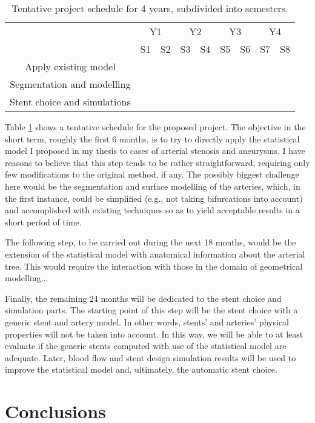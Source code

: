 \documentclass[a4paper]{article}
\begin{document}
\begin{table}[h]
\centering
\caption{Tentative project schedule for 4 years, subdivided into semesters.}
\begin{tabular}{c|c|c|c|c|c|c|c|c|}
\cline{2-9}
 & \multicolumn{2}{|c|}{Y1} & \multicolumn{2}{|c|}{Y2} & \multicolumn{2}{|c|}{Y3} & \multicolumn{2}{|c|}{Y4} \\ \cline{2-9}
 & S1 & S2 & S3 & S4 & S5 & S6 & S7 & S8  \\ \hline
\multicolumn{1}{|c|}{Apply existing model} & \cellcolor{green} & & & & & & & \\ \hline
\multicolumn{1}{|c|}{Segmentation and modelling} & & \cellcolor{green} & \cellcolor{green} & \cellcolor{green} & & & & \\ \hline
\multicolumn{1}{|c|}{Stent choice and simulations} & & & & & \cellcolor{green} & \cellcolor{green} & \cellcolor{green} & \cellcolor{green} \\ \hline
\end{tabular}
\label{tab:schedule}
\end{table}

Table \ref{tab:schedule} shows a tentative schedule for the proposed project. The objective in the short term, roughly the first 6 months, is to try to directly apply the statistical model I proposed in my thesis to cases of arterial stenosis and aneurysms. I have reasons to believe that this step tends to be rather straightforward, requiring only few modifications to the original method, if any. The possibly biggest challenge here would be the segmentation and surface modelling of the arteries, which, in the first instance, could be simplified (e.g., not taking bifurcations into account) and accomplished with existing techniques so as to yield acceptable results in a short period of time. 

The following step, to be carried out during the next 18 months, would be the extension of the statistical model with anatomical information about the arterial tree. This would require the interaction with those in the domain of geometrical modelling...

Finally, the remaining 24 months will be dedicated to the stent choice and simulation parts. The starting point of this step will be the stent choice with a generic stent and artery model. In other words, stents' and arteries' physical properties will not be taken into account. In this way, we will be able to at least evaluate if the generic stents computed with use of the statistical model are adequate. Later, blood flow and stent design simulation results will be used to improve the statistical model and, ultimately, the automatic stent choice.  

\section{Conclusions}



\end{document}
